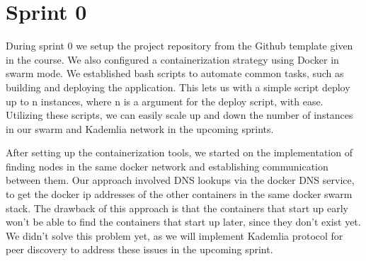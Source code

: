 \section{Sprint 0}
During sprint 0 we setup the project repository from the Github template given in the course. We also configured a containerization strategy using Docker in swarm mode. We established bash scripts to automate common tasks, such as building and deploying the application. This lets us with a simple script deploy up to n instances, where n is a argument for the deploy script, with ease. Utilizing these scripts, we can easily scale up and down the number of instances in our swarm and Kademlia network in the upcoming sprints.

After setting up the containerization tools, we started on the implementation of finding nodes in the same docker network and establishing communication between them. Our approach involved DNS lookups via the docker DNS service, to get the docker ip addresses of the other containers in the same docker swarm stack. The drawback of this approach is that the containers that start up early won't be able to find the containers that start up later, since they don't exist yet. We didn't solve this problem yet, as we will implement Kademlia protocol for peer discovery to address these issues in the upcoming sprint.